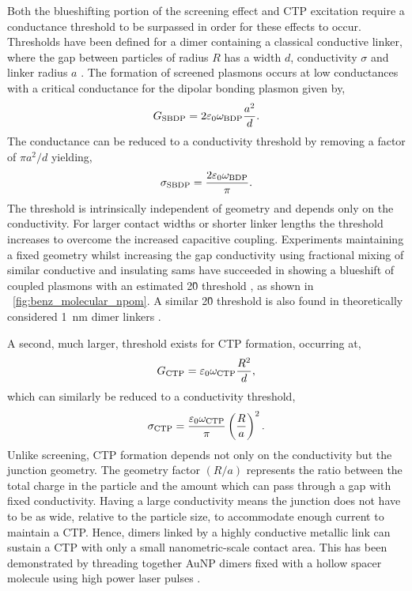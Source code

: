 \documentclass{article}
\begin{document}
Both the blueshifting portion of the screening effect and CTP excitation require a conductance threshold to be surpassed in order for these effects to occur. Thresholds have been defined for a dimer containing a classical conductive linker, where the gap between particles of radius $R$ has a width $d$, conductivity $\sigma$ and linker radius $a$ \cite{perez2010}. The formation of screened plasmons occurs at low conductances with a critical conductance for the dipolar bonding plasmon given by,
\begin{equation}
	G_{\mathrm{SBDP}} = 2\varepsilon_0\omega_{\mathrm{BDP}}\frac{a^2}{d}.
\end{equation}
The conductance can be reduced to a conductivity threshold by removing a factor of $\pi a^2/d$ yielding,
\begin{equation}
	\sigma_{\mathrm{SBDP}} = \frac{2\varepsilon_0\omega_{\mathrm{BDP}}}{\pi}.
\end{equation}
The threshold is intrinsically independent of geometry and depends only on the conductivity. For larger contact widths or shorter linker lengths the threshold increases to overcome the increased capacitive coupling. Experiments maintaining a fixed geometry whilst increasing the gap conductivity using fractional mixing of similar conductive and insulating \glspl{sam} have succeeded in showing a blueshift of coupled plasmons with an estimated 2\G0 threshold \cite{benz2014}, as shown in \figurename~\ref{fig:benz_molecular_npom}. A similar 2\G0 threshold is also found in theoretically considered \SI{1}{nm} dimer linkers \cite{perez2010}.

A second, much larger, threshold exists for CTP formation, occurring at,
\begin{equation}
	G_{\mathrm{CTP}} = \varepsilon_0\omega_{\mathrm{CTP}}\frac{R^2}{d},
\end{equation}
which can similarly be reduced to a conductivity threshold,
\begin{equation}
	\sigma_{\mathrm{CTP}} = \frac{\varepsilon_0\omega_{\mathrm{CTP}}}{\pi} \left(\frac{R}{a}\right)^2.
\end{equation}
Unlike screening, CTP formation depends not only on the conductivity but the junction geometry. The geometry factor $(R/a)$ represents the ratio between the total charge in the particle and the amount which can pass through a gap with fixed conductivity. Having a large conductivity means the junction does not have to be as wide, relative to the particle size, to accommodate enough current to maintain a CTP. Hence, dimers linked by a highly conductive metallic link can sustain a CTP with only a small nanometric-scale contact area. This has been demonstrated by threading together AuNP dimers fixed with a hollow spacer molecule using high power laser pulses \cite{herrmann2014, tserkezis2014}. %
\end{document}
